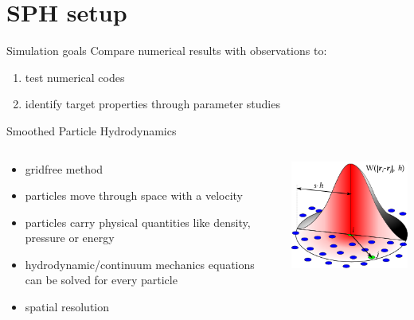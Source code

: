 \documentclass{beamer}
\begin{document}
\section{SPH setup}
\begin{frame}{Simulation goals}
Compare numerical results with observations to:
\begin{enumerate}
	\item test numerical codes \pause
	\item identify target properties through parameter studies
\end{enumerate}
\end{frame}

\begin{frame}{Smoothed Particle Hydrodynamics}
	\begin{columns}
		\begin{column}{0.55\textwidth}
			\begin{itemize}
				\item gridfree method
				\item particles move through space with a velocity
				\item particles carry physical quantities like density, pressure or energy
				\item hydrodynamic/continuum mechanics equations can be solved for every particle
				\item spatial resolution 
			\end{itemize}
		\end{column}
		\begin{column}{0.4\textwidth}
			\vspace{\topsep}	
			\includegraphics[width=\columnwidth]{sph_method.png}
		\end{column}
	\end{columns}
\end{frame}
\end{document}
